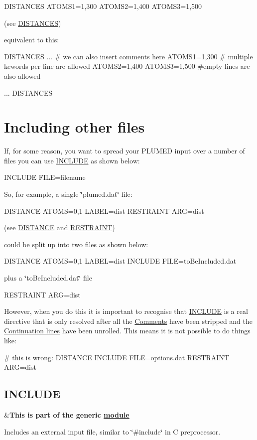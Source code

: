 \begin{DoxyVerb}DISTANCES ATOMS1=1,300 ATOMS2=1,400 ATOMS3=1,500
\end{DoxyVerb}
 (see \hyperlink{DISTANCES}{D\+I\+S\+T\+A\+N\+C\+E\+S})

equivalent to this\+:

\begin{DoxyVerb}DISTANCES ...
# we can also insert comments here
  ATOMS1=1,300
# multiple kewords per line are allowed
  ATOMS2=1,400 ATOMS3=1,500
#empty lines are also allowed

... DISTANCES
\end{DoxyVerb}
 \hypertarget{includes}{}\section{Including other files}\label{includes}
If, for some reason, you want to spread your P\+L\+U\+M\+E\+D input over a number of files you can use \hyperlink{INCLUDE}{I\+N\+C\+L\+U\+D\+E} as shown below\+:

\begin{DoxyVerb}INCLUDE FILE=filename
\end{DoxyVerb}


So, for example, a single \char`\"{}plumed.\+dat\char`\"{} file\+:

\begin{DoxyVerb}DISTANCE ATOMS=0,1 LABEL=dist
RESTRAINT ARG=dist
\end{DoxyVerb}
 (see \hyperlink{DISTANCE}{D\+I\+S\+T\+A\+N\+C\+E} and \hyperlink{RESTRAINT}{R\+E\+S\+T\+R\+A\+I\+N\+T})

could be split up into two files as shown below\+:

\begin{DoxyVerb}DISTANCE ATOMS=0,1 LABEL=dist
INCLUDE FILE=toBeIncluded.dat
\end{DoxyVerb}
 plus a \char`\"{}to\+Be\+Included.\+dat\char`\"{} file \begin{DoxyVerb}RESTRAINT ARG=dist
\end{DoxyVerb}


However, when you do this it is important to recognise that \hyperlink{INCLUDE}{I\+N\+C\+L\+U\+D\+E} is a real directive that is only resolved after all the \hyperlink{comments}{Comments} have been stripped and the \hyperlink{ContinuationLines}{Continuation lines} have been unrolled. This means it is not possible to do things like\+:

\begin{DoxyVerb}# this is wrong:
DISTANCE INCLUDE FILE=options.dat
RESTRAINT ARG=dist
\end{DoxyVerb}
 \hypertarget{INCLUDE}{}\subsection{I\+N\+C\+L\+U\+D\+E}\label{INCLUDE}
\begin{TabularC}{2}
\hline
&{\bfseries  This is part of the generic \hyperlink{mymodules}{module }}   \\
\end{TabularC}
Includes an external input file, similar to \char`\"{}\#include\char`\"{} in C preprocessor.

